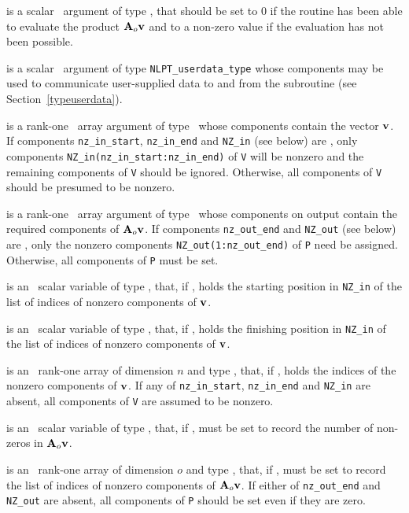 \documentclass{galahad}
\begin{document}
\begin{description}
 is a scalar \intentout\ argument of type \integer,
that should be set to 0 if the routine has been able to evaluate the
product ${\mathbf{A}}_o {\mathbf{v}}$
and to a non-zero value if the evaluation has not been possible.

 is a scalar \intentinout\ argument of type
{\tt NLPT\_userdata\_type} whose components may be used
to communicate user-supplied data to and from the
subroutine (see Section~\ref{typeuserdata}).

 is a rank-one \intentin\ array argument of type \realdp\
whose components contain the vector ${\mathbf{v}}$.
If components
{\tt nz\_in\_start},
{\tt nz\_in\_end}
and
{\tt NZ\_in}
(see below) are \present,
only components {\tt NZ\_in(nz\_in\_start:nz\_in\_end)} of {\tt V}
will be nonzero and the remaining components of {\tt V} should be
ignored. Otherwise, all components of {\tt V} should be presumed to be nonzero.

 is a rank-one \intentout\ array argument of type \realdp\
whose components on output contain the required components of ${\mathbf{A}}_o {\mathbf{v}}$.
If components
{\tt nz\_out\_end}
and
{\tt NZ\_out}
(see below) are \present,
only the nonzero components {\tt NZ\_out(1:nz\_out\_end)} of {\tt P}
need be assigned.
Otherwise, all components of {\tt P} must be set.

 is an \optional\ scalar variable of type \integer,
that, if \present, holds the starting position in {\tt NZ\_in}
of the list of indices of nonzero components of ${\mathbf{v}}$.

 is an \optional\ scalar variable of type \integer,
that, if \present, holds the finishing position in {\tt NZ\_in}
of the list of indices of nonzero components of ${\mathbf{v}}$.

 is an \optional\  rank-one array of dimension $n$
and type \integer, that, if \present, holds the indices of the
nonzero components of ${\mathbf{v}}$. If any of
{\tt nz\_in\_start},
{\tt nz\_in\_end}
and
{\tt NZ\_in}
are absent, all components of {\tt V} are assumed to be nonzero.

\itt{nz\_out\_end} is an \optional\ scalar variable of type \integer,
that, if \present, must be set to record the number of non-zeros in
${\mathbf{A}}_o {\mathbf{v}}$.

 is an \optional\ rank-one array of dimension $o$
and type \integer, that, if \present, must be set to record the list
of indices of nonzero components of ${\mathbf{A}}_o {\mathbf{v}}$.
If either of
{\tt nz\_out\_end}
and
{\tt NZ\_out}
are absent, all components of {\tt P} should be set even if they are zero.


\end{description}
\end{document}
